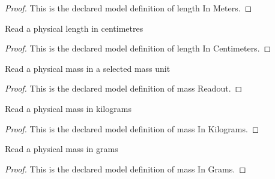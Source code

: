 \begin{proof}
  This is the declared model definition of length In Meters.
\end{proof}
\begin{definition}
  \label{def:physics:phyx-mini-0694:phyxminiproblems-problemphyxmini0694-lengthincentimeters}
  Read a physical length in centimetres
\end{definition}
\begin{proof}
  This is the declared model definition of length In Centimeters.
\end{proof}
\begin{definition}
  \label{def:physics:phyx-mini-0694:phyxminiproblems-problemphyxmini0694-massreadout}
  Read a physical mass in a selected mass unit
\end{definition}
\begin{proof}
  This is the declared model definition of mass Readout.
\end{proof}
\begin{definition}
  \label{def:physics:phyx-mini-0694:phyxminiproblems-problemphyxmini0694-massinkilograms}
  Read a physical mass in kilograms
\end{definition}
\begin{proof}
  This is the declared model definition of mass In Kilograms.
\end{proof}
\begin{definition}
  \label{def:physics:phyx-mini-0694:phyxminiproblems-problemphyxmini0694-massingrams}
  Read a physical mass in grams
\end{definition}
\begin{proof}
  This is the declared model definition of mass In Grams.
\end{proof}
